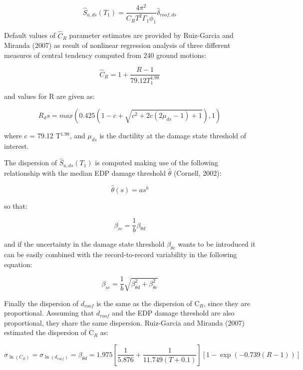 \begin{equation}
\hat{S}_{a,ds}(T_1) = \frac{4 \pi^2}{C_R T^2 \Gamma_1 \phi_1} \hat{\delta}_{roof, ds}
\end{equation}

Default values of $\hat{C}_R$ parameter estimates are provided by Ruiz-Garcia and Miranda (2007) as result of nonlinear regression analysis of three different measures of central tendency computed from 240 ground motions:

\begin{equation}
\hat{C}_R = 1 + \frac{R - 1}{79.12 T_1 ^{1.98}}
\end{equation}

and values for R are given as:

\begin{equation}
R_ds = max(0.425(1 - c + \sqrt{c^2 + 2c(2 \mu_{ds} - 1) + 1}),1)
\end{equation}

where c = 79.12 T$^{1.98}$, and $\mu_{ds}$ is the ductility at the damage state threshold of interest.

The dispersion of $\hat{S}_{a,ds}(T_1)$ is computed making use of the following relationship with the median EDP damage threshold $\hat{\theta}$ (Cornell, 2002):

\begin{equation}
\hat{\theta}(s) = a s^b
\end{equation}

so that:

\begin{equation}
\beta_{sc} = \frac{1}{b} \beta_{\theta d}
\end{equation}

and if the uncertainty in the damage state threshold $\beta_{\theta c}$ wants to be introduced it can be easily combined with the record-to-record variability in the following equation:

\begin{equation}
\beta_{sc} = \frac{1}{b} \sqrt{\beta_{\theta d}^2 + \beta_{\theta c}^2} 
\end{equation}

Finally the dispersion of $d_{roof}$ is the same as the dispersion of C$_R$, since they are proportional. Asssuming that $d_{roof}$ and the EDP damage threshold are also proportional, they share the same dispersion. Ruiz-Garcia and Miranda (2007) estimated the dispersion of C$_R$ as:

\begin{equation}
\sigma_{\ln(C_R)} = \sigma_{\ln(d_{roof})} = \beta_{\theta d} =  1.975 [\frac{1}{5.876} + \frac{1}{11.749 (T + 0.1)}] [1- \exp(-0.739 (R - 1))]
\end{equation}

